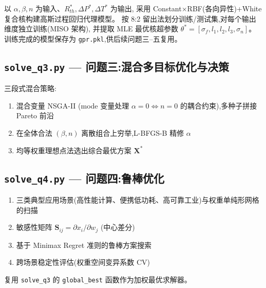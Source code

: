 以 $\alpha,\beta,n$ 为输入、$R_{th}^*,\Delta P^*,\Delta T^*$ 为输出,
采用 Constant$\times$RBF(各向异性)+White 复合核构建高斯过程回归代理模型。
按 8:2 留出法划分训练/测试集,对每个输出维度独立训练(MISO 架构),
并提取 MLE 最优核超参数 $\theta^*=[\sigma_f,l_1,l_2,l_3,\sigma_n]$。
训练完成的模型保存为 \texttt{gpr.pkl},供后续问题三--五复用。



\newpage
\subsection{\texttt{solve\_q3.py} — 问题三:混合多目标优化与决策}

三段式混合策略:
\begin{enumerate}[label=(\arabic*)]
    \item 混合变量 NSGA-II (mode 变量处理 $\alpha=0\Leftrightarrow n=0$ 的耦合约束),多种子拼接 Pareto 前沿
    \item 在全体合法 $(\beta,n)$ 离散组合上穷举,L-BFGS-B 精修 $\alpha$
    \item 均等权重理想点法选出综合最优方案 $\mathbf{X}^*$
\end{enumerate}



\newpage
\subsection{\texttt{solve\_q4.py} — 问题四:鲁棒优化}

\begin{enumerate}[label=(\arabic*)]
    \item 三类典型应用场景(高性能计算、便携低功耗、高可靠工业)与权重单纯形网格的扫描
    \item 敏感性矩阵 $\mathbf{S}_{ij}=\partial x_i/\partial w_j$ (中心差分)
    \item 基于 Minimax Regret 准则的鲁棒方案搜索
    \item 跨场景稳定性评估(权重空间变异系数 CV)
\end{enumerate}
复用 \texttt{solve\_q3} 的 \texttt{global\_best} 函数作为加权最优求解器。



